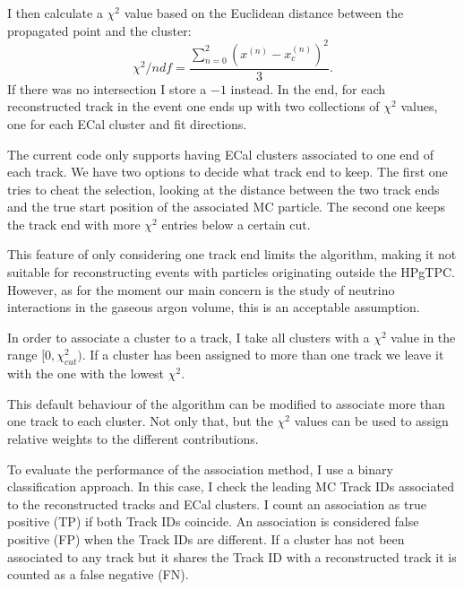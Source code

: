 I then calculate a $\chi^{2}$ value based on the Euclidean distance between the propagated point and the cluster:
\begin{equation}
	\chi^{2}/ndf = \frac{\sum_{n=0}^{2}\left(x^{(n)}-x^{(n)}_{c}\right)^{2}}{3}.
\end{equation}
If there was no intersection I store a $-1$ instead. In the end, for each reconstructed track in the event one ends up with two collections of $\chi^{2}$ values, one for each ECal cluster and fit directions.

The current code only supports having ECal clusters associated to one end of each track. We have two options to decide what track end to keep. The first one tries to cheat the selection, looking at the distance between the two track ends and the true start position of the associated MC particle. The second one keeps the track end with more $\chi^{2}$ entries below a certain cut.

This feature of only considering one track end limits the algorithm, making it not suitable for reconstructing events with particles originating outside the HPgTPC. However, as for the moment our main concern is the study of neutrino interactions in the gaseous argon volume, this is an acceptable assumption.

In order to associate a cluster to a track, I take all clusters with a $\chi^{2}$ value in the range $[0, \chi^{2}_{cut})$. If a cluster has been assigned to more than one track we leave it with the one with the lowest $\chi^{2}$.

This default behaviour of the algorithm can be modified to associate more than one track to each cluster. Not only that, but the $\chi^{2}$ values can be used to assign relative weights to the different contributions.

To evaluate the performance of the association method, I use a binary classification approach. In this case, I check the leading MC Track IDs associated to the reconstructed tracks and ECal clusters. I count an association as true positive (TP) if both Track IDs coincide. An association is considered false positive (FP) when the Track IDs are different. If a cluster has not been associated to any track but it shares the Track ID with a reconstructed track it is counted as a false negative (FN).

